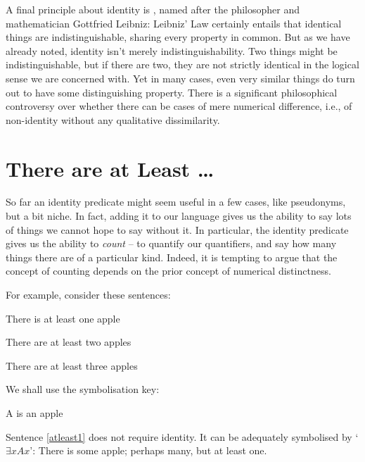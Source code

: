A final principle about identity is , named after the philosopher and mathematician Gottfried Leibniz:  
Leibniz' Law certainly entails that identical things are indistinguishable, sharing every property in common. But as we have already noted, identity isn't merely indistinguishability. Two things might be indistinguishable, but if there are two, they are not strictly identical in the logical sense we are concerned with. Yet in many cases, even very similar things do turn out to have some distinguishing property. There is a significant philosophical controversy over whether there can be cases of mere numerical difference, i.e., of non-identity without any qualitative dissimilarity. 

\section{There are at Least …}

So far an identity predicate might seem useful in a few cases, like pseudonyms, but a bit niche. In fact, adding it to our language gives us the ability to say lots of things we cannot hope to say without it. In particular, the identity predicate gives us the ability to \emph{count} – to quantify our quantifiers, and say how many things there are of a particular kind. Indeed, it is tempting to argue that the concept of counting depends on the prior concept of numerical distinctness.

For example, consider these sentences:
\begin{earg}
\item[\ex{atleast1}] There is at least one apple
\item[\ex{atleast2}] There are at least two apples
\item[\ex{atleast3}] There are at least three apples
\end{earg}
We shall use the symbolisation key:
	\begin{ekey}
		\item[A]  is an apple
	\end{ekey}
Sentence \ref{atleast1} does not require identity. It can be adequately symbolised by `$\exists x Ax$': There is some apple; perhaps many, but at least one.

